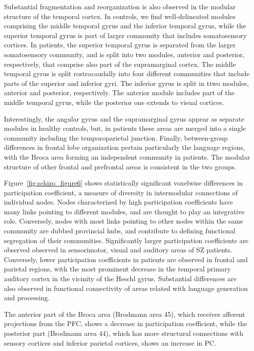 Substantial fragmentation and reorganization is also observed in the modular structure of the temporal cortex.
In controls, we find well-delineated modules comprising the middle temporal gyrus and the inferior temporal gyrus, while the superior temporal gyrus is part of larger community that includes somatosensory cortices.
In patients, the superior temporal gyrus is separated from the larger somatosensory community, and is split into two modules, anterior and posterior, respectively, that comprise also part of the supramarginal cortex.
The middle temporal gyrus is split rostrocaudally into four different communities that include parts of the superior and inferior gyri.
The inferior gyrus is split in ttwo modules, anterior and posterior, respectively.
The anterior module includes part of the middle temporal gyrus, while the posterior one extends to visual cortices. 

Interestingly, the angular gyrus and the supramarginal gyrus appear as separate modules in healthy controls, but, in patients these areas are merged into a single community including the temporoparietal junction. 
Finally, between-group differences in frontal lobe organization pertain particularly the language regions, with the Broca area forming an independent community in patients.
The modular structure of other frontal and prefrontal areas is consistent in the two groups.

Figure~\ref{fig:schizo_figure6} shows statistically significant voxelwise differences in participation coefficient, a measure of diversity in intermodular connections of individual nodes.
Nodes characterized by high participation coefficients have many links pointing to different modules, and are thought to play an integrative role. 
Conversely, nodes with most links pointing to other nodes within the same community are dubbed provincial hubs, and contribute to defining functional segregation of their communities.
Significantly larger participation coefficients are observed observed in sensorimotor, visual and auditory areas of SZ patients.
Conversely, lower participation coefficients in patients are observed in frontal and parietal regions, with the most prominent decrease in the temporal primary auditory cortex in the vicinity of the Heschl gyrus.
Substantial differences are also observed in functional connectivity of areas related with language generation and processing.

The anterior part of the Broca area (Brodmann area 45), which receives afferent projections from the PFC, shows a decrease in participation coefficient, while the posterior part (Brodmann area 44), which has more structural connections with sensory cortices and inferior parietal cortices, shows an increase in PC. 

